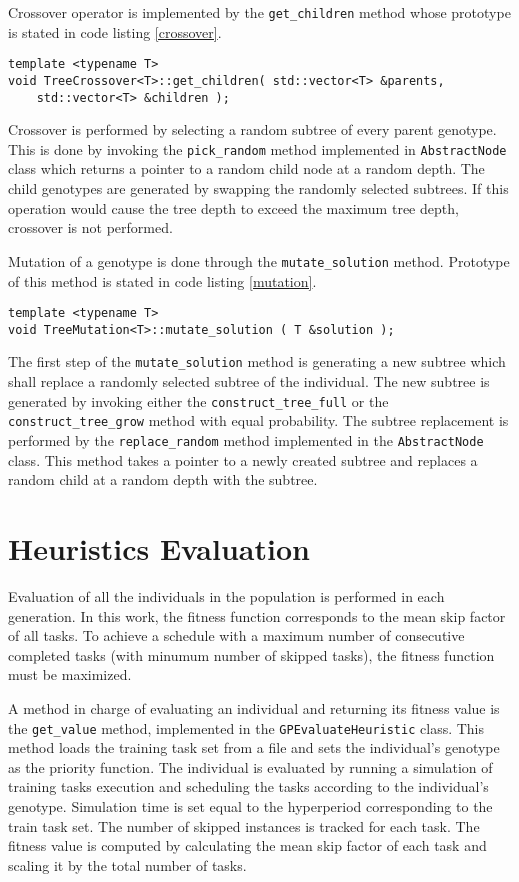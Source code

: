 Crossover operator is implemented by the \texttt{get\_children} method whose prototype is stated in code listing \ref{crossover}.
\begin{lstlisting}[frame=none, label={crossover}, caption={Prototype of the \texttt{get\_children} method which performs crossover.}, captionpos=b]
template <typename T>
void TreeCrossover<T>::get_children( std::vector<T> &parents, 
	std::vector<T> &children );
\end{lstlisting}
Crossover is performed by selecting a random subtree of every parent genotype.
This is done by invoking the \texttt{pick\_random} method implemented in \texttt{AbstractNode} class which returns a pointer to a random child node at a random depth.
The child genotypes are generated by swapping the randomly selected subtrees.
If this operation would cause the tree depth to exceed the maximum tree depth, crossover is not performed.

Mutation of a genotype is done through the \texttt{mutate\_solution} method.
Prototype of this method is stated in code listing \ref{mutation}.
\begin{lstlisting}[frame=none, label={mutation}, caption={Prototype of the \texttt{mutate\_solution} method.}, captionpos=b]
template <typename T>
void TreeMutation<T>::mutate_solution ( T &solution );
\end{lstlisting}
The first step of the \texttt{mutate\_solution} method is generating a new subtree which shall replace a randomly selected subtree of the individual.
The new subtree is generated by invoking either the \texttt{construct\_tree\_full} or the \texttt{construct\_tree\_grow} method with equal probability.
The subtree replacement is performed by the \texttt{replace\_random} method implemented in the \texttt{AbstractNode} class.
This method takes a pointer to a newly created subtree and replaces a random child at a random depth with the subtree.

\section{Heuristics Evaluation}
\label{evaluation}
Evaluation of all the individuals in the population is performed in each generation.
In this work, the fitness function corresponds to the mean skip factor of all tasks.
To achieve a schedule with a maximum number of consecutive completed tasks (with minumum number of skipped tasks), the fitness function must be maximized.

A method in charge of evaluating an individual and returning its fitness value is the \texttt{get\_value} method, implemented in the \texttt{GPEvaluateHeuristic} class.
This method loads the training task set from a file and sets the individual's genotype as the priority function.
The individual is evaluated by running a simulation of training tasks execution and scheduling the tasks according to the individual's genotype.
Simulation time is set equal to the hyperperiod corresponding to the train task set.
The number of skipped instances is tracked for each task.
The fitness value is computed by calculating the mean skip factor of each task and scaling it by the total number of tasks.

